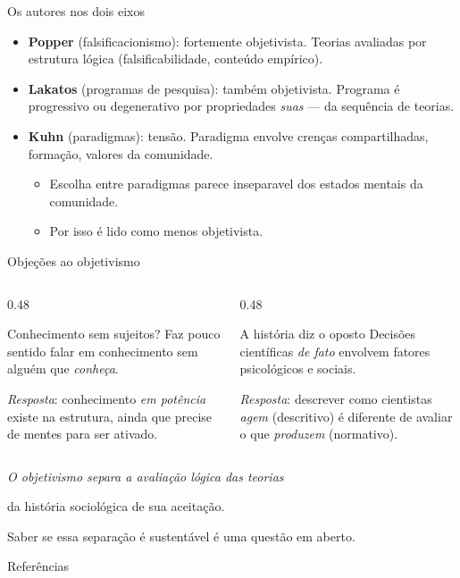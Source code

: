 \documentclass[aspectratio=169]{beamer}
\newcommand{\impt}[1]{\textcolor{maccent}{\textbf{#1}}}
\newcommand{\ntc}[1]{\textcolor{mprimary}{#1}}
\begin{document}
\begin{frame}{Os autores nos dois eixos}
\begin{itemize}
    \item \impt{Popper} (falsificacionismo): fortemente objetivista. Teorias avaliadas por estrutura l\'ogica (falsificabilidade, conte\'udo emp\'irico).
    \item \impt{Lakatos} (programas de pesquisa): tamb\'em objetivista. Programa \'e progressivo ou degenerativo por propriedades \emph{suas} --- da sequ\^encia de teorias.
    \item \impt{Kuhn} (paradigmas): \ntc{tens\~ao}. Paradigma envolve cren\c cas compartilhadas, forma\c c\~ao, valores da comunidade.
    \begin{itemize}
        \item Escolha entre paradigmas parece inseparavel dos estados mentais da comunidade.
        \item Por isso \'e lido como menos objetivista.
    \end{itemize}
\end{itemize}
\end{frame}

\begin{frame}{Obje\c c\~oes ao objetivismo}
\begin{columns}[T]
\begin{column}{0.48\textwidth}
\begin{alertblock}{Conhecimento sem sujeitos?}
Faz pouco sentido falar em conhecimento sem algu\'em que \emph{conhe\c ca}.

\vspace{0.15cm}
\textit{Resposta}: conhecimento \emph{em pot\^encia} existe na estrutura, ainda que precise de mentes para ser ativado.
\end{alertblock}
\end{column}
\begin{column}{0.48\textwidth}
\begin{alertblock}{A hist\'oria diz o oposto}
Decis\~oes cient\'ificas \emph{de fato} envolvem fatores psicol\'ogicos e sociais.

\vspace{0.15cm}
\textit{Resposta}: descrever como cientistas \emph{agem} (descritivo) \'e diferente de avaliar o que \emph{produzem} (normativo).
\end{alertblock}
\end{column}
\end{columns}
\vspace{0.4cm}
\begin{center}
\itshape O objetivismo separa a avalia\c c\~ao l\'ogica das teorias

da hist\'oria sociol\'ogica de sua aceita\c c\~ao.

Saber se essa separa\c c\~ao \'e sustent\'avel \'e uma quest\~ao em aberto.
\end{center}
\end{frame}

\begin{frame}[allowframebreaks]{Refer\^encias}
  
  
\end{frame}
\end{document}
